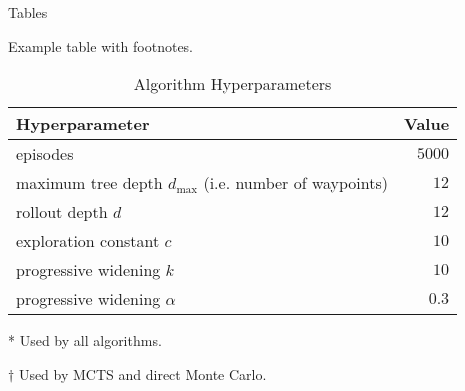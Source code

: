 \begin{frame}{Tables}

Example table with footnotes.

\begin{table}[!t]
    \centering
    \caption{\label{tab:mcts_params} Algorithm Hyperparameters}
    \begin{threeparttable}
    \begin{tabular}{@{}lr@{}}
        \toprule
        \textbf{Hyperparameter} & \textbf{Value} \\
        \midrule
        episodes \tnote{*} & $5000$ \\
        maximum tree depth $d_\text{max}$ (i.e. number of waypoints) \tnote{*} & $12$ \\
        rollout depth $d$ \tnote{$\dagger$} & $12$ \\
        exploration constant $c$ & $10$ \\
        progressive widening $k$ & $10$ \\
        progressive widening $\alpha$ & $0.3$ \\
        \bottomrule
    \end{tabular}
    \begin{tablenotes}
        \scriptsize
        \item[*] {Used by all algorithms.}
        \item[$\dagger$] {Used by MCTS and direct Monte Carlo.}
    \end{tablenotes}
    \end{threeparttable}
\end{table}

\end{frame}